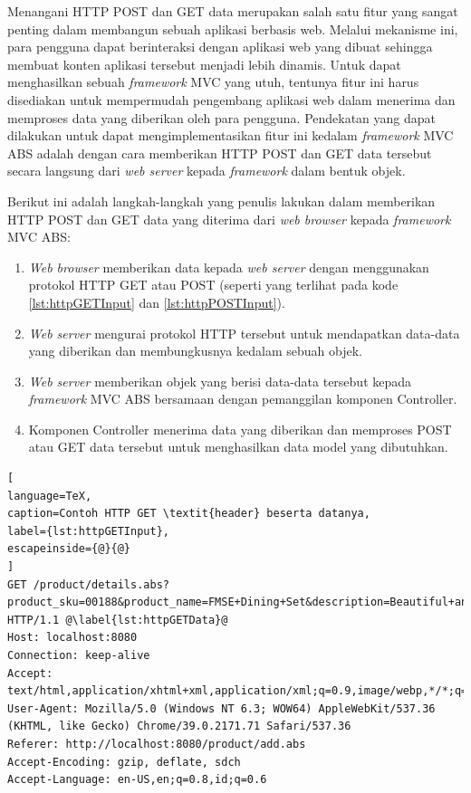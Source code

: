 Menangani HTTP POST dan GET data merupakan salah satu fitur yang sangat penting dalam membangun sebuah aplikasi berbasis web. Melalui mekanisme ini, para pengguna dapat berinteraksi dengan aplikasi web yang dibuat sehingga membuat konten aplikasi tersebut menjadi lebih dinamis. Untuk dapat menghasilkan sebuah \textit{framework} MVC yang utuh, tentunya fitur ini harus disediakan untuk mempermudah pengembang aplikasi web dalam menerima dan memproses data yang diberikan oleh para pengguna. Pendekatan yang dapat dilakukan untuk dapat mengimplementasikan fitur ini kedalam \textit{framework} MVC ABS adalah dengan cara memberikan HTTP POST dan GET data tersebut secara langsung dari \textit{web server} kepada \textit{framework} dalam bentuk objek.

Berikut ini adalah langkah-langkah yang penulis lakukan dalam memberikan HTTP POST dan GET data yang diterima dari \textit{web browser} kepada \textit{framework} MVC ABS:

\begin{enumerate}
    \item \textit{Web browser} memberikan data kepada \textit{web server} dengan menggunakan protokol HTTP GET atau POST (seperti yang terlihat pada kode \ref{lst:httpGETInput} dan \ref{lst:httpPOSTInput}).
    \item \textit{Web server} mengurai protokol HTTP tersebut untuk mendapatkan data-data yang diberikan dan membungkusnya kedalam sebuah objek.
    \item \textit{Web server} memberikan objek yang berisi data-data tersebut kepada \textit{framework} MVC ABS bersamaan dengan pemanggilan komponen Controller.
    \item Komponen Controller menerima data yang diberikan dan memproses POST atau GET data tersebut untuk menghasilkan data model yang dibutuhkan.
\end{enumerate}

\begin{lstlisting}[
language=TeX,
caption=Contoh HTTP GET \textit{header} beserta datanya,
label={lst:httpGETInput},
escapeinside={@}{@}
]
GET /product/details.abs?product_sku=00188&product_name=FMSE+Dining+Set&description=Beautiful+and+Cute+Dining+Set&price=250000 HTTP/1.1 @\label{lst:httpGETData}@
Host: localhost:8080
Connection: keep-alive
Accept: text/html,application/xhtml+xml,application/xml;q=0.9,image/webp,*/*;q=0.8
User-Agent: Mozilla/5.0 (Windows NT 6.3; WOW64) AppleWebKit/537.36 (KHTML, like Gecko) Chrome/39.0.2171.71 Safari/537.36
Referer: http://localhost:8080/product/add.abs
Accept-Encoding: gzip, deflate, sdch
Accept-Language: en-US,en;q=0.8,id;q=0.6
\end{lstlisting}

